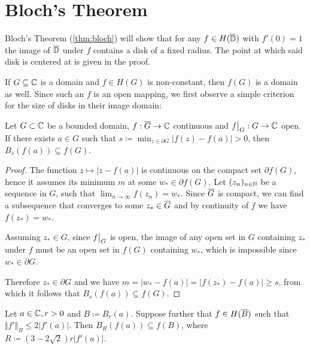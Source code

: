 \section{Bloch's Theorem}
\label{sec:blochs-theorem}

Bloch's Theorem (\ref{thm:bloch}) will show that for any $f \in H(\overline{\mathbb{D}})$ with $f'(0) = 1$ the image of $\overline{\mathbb{D}}$ under $f$ contains a disk of a fixed radius. The point at which said disk is centered at is given in the proof.

If $G \subseteq \mathbb{C}$ is a domain and $f \in H(G)$ is non-constant, then $f(G)$ is a domain as well. Since such an $f$ is an open mapping, we first observe a simple criterion for the size of disks in their image domain:

\begin{lemma} \label{lem:bloch-lemma-1}
    Let $G \subset \mathbb{C}$ be a bounded domain, $f : \overline{G} \to \mathbb{C}$ continuous and $\restr{f}{G} : G \to \C$ open. If there exists $a \in G$ such that $s \coloneqq \min_{z \in \partial G} \vert f(z) - f(a) \vert > 0$, then $B_{s}(f(a)) \subseteq f(G)$.
\end{lemma}

\begin{proof}
    The function $z \mapsto \vert z - f(a) \vert$ is continuous on the compact set $\partial f(G)$, hence it assumes its minimum $m$ at some $w_* \in \partial f(G)$. Let $(z_n)_{n \in \mathbb{N}}$ be a sequence in $G$, such that $\lim_{n \to \infty} f(z_n) = w_*$. Since $\overline{G}$ is compact, we can find a subsequence that converges to some $z_* \in \overline{G}$ and by continuity of $f$ we have $f(z_*) = w_*$.

    Assuming $z_* \in G$, since $\restr{f}{G}$ is open, the image of any open set in $G$ containing $z_*$ under $f$ must be an open set in $f(G)$ containing $w_*$, which is impossible since $w_* \in \partial G$.

    Therefore $z_* \in \partial G$ and we have $m = \vert w_* - f(a) \vert = \vert f(z_*) - f(a) \vert \geq s$, from which it follows that $B_{s}(f(a)) \subseteq f(G)$.
\end{proof}

\begin{lemma} \label{lem:bloch-lemma-2}
    Let $a \in \mathbb{C}, r > 0$ and $B \coloneqq B_{r}(a)$. Suppose further that $f \in H(\overline{B})$ such that $\Vert f' \Vert_B \leq 2 \vert f'(a) \vert$. Then $ B_{R}(f(a)) \subseteq f(B)$, where $ R \coloneqq (3 - 2 \sqrt{2}) r \vert f'(a) \vert $.
\end{lemma}

